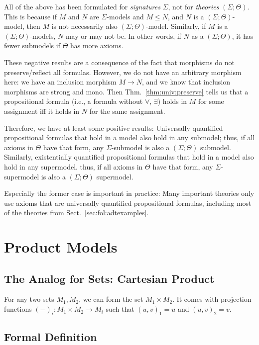 All of the above has been formulated for \emph{signatures} $\Sigma$, not for \emph{theories} $(\Sigma;\Theta)$.
This is because if $M$ and $N$ are $\Sigma$-models and $M\leq N$, and $N$ is a $(\Sigma;\Theta)$-model, then $M$ is not necessarily also $(\Sigma;\Theta)$-model.
Similarly, if $M$ is a $(\Sigma;\Theta)$-models, $N$ may or may not be.
In other words, if $N$ as a $(\Sigma;\Theta)$, it has fewer submodels if $\Theta$ has more axioms.

These negative results are a consequence of the fact that morphisms do not preserve/reflect all formulas.
However, we do not have an arbitrary morphism here: we have an inclusion morphism $M\to N$, and we know that inclusion morphisms are strong and mono.
Then Thm.~\ref{thm:univ:preserve} tells us that a propositional formula (i.e., a formula without $\forall$, $\exists$) holds in $M$ for some assignment iff it holds in $N$ for the same assignment.

Therefore, we have at least some positive results:
Universally quantified propositional formulas that hold in a model also hold in any submodel;
thus, if all axioms in $\Theta$ have that form, any $\Sigma$-submodel is also a $(\Sigma;\Theta)$ submodel.
Similarly, existentially quantified propositional formulas that hold in a model also hold in any supermodel.
thus, if all axioms in $\Theta$ have that form, any $\Sigma$-supermodel is also a $(\Sigma;\Theta)$ supermodel.

Especially the former case is important in practice:
Many important theories only use axioms that are universally quantified propositional formulas, including most of the theories from Sect.~\ref{sec:fol:adtexamples}.

\section{Product Models}\label{sec:univ:prod}

\subsection{The Analog for Sets: Cartesian Product}

For any two sets $M_1,M_2$, we can form the set $M_1\times M_2$.
It comes with projection functions $(-)_i:M_1\times M_2\to M_i$ such that $(u,v)_1=u$ and $(u,v)_2=v$.

\subsection{Formal Definition}

